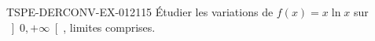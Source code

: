 \begin{exercice}{TSPE-DERCONV-EX-012}{1}{15}
Étudier les variations de $f(x) = x\ln x$ sur $\left]0, +\infty\right[$, limites comprises.

\end{exercice}
